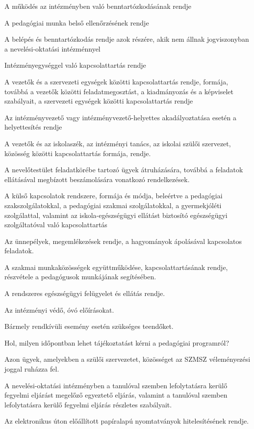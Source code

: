 A működés az intézményben való benntartózkodásának rendje

A pedagógiai munka belső ellenőrzésének rendje

A belépés és benntartózkodás rendje azok részére, akik nem állnak jogviszonyban a nevelési-oktatási intézménnyel

Intézményegységgel való kapcsolattartás rendje


A vezetők és a szervezeti egységek közötti kapcsolattartás rendje, formája, továbbá a vezetők közötti feladatmegosztást, a kiadmányozás és a képviselet szabályait, a szervezeti egységek közötti kapcsolattartás rendje

Az intézményvezető vagy intézményvezető-helyettes akadályoztatása esetén a helyettesítés rendje

A vezetők és az iskolaszék, az intézményi tanács, az iskolai szülői szervezet, közösség közötti kapcsolattartás formája, rendje.

A nevelőtestület feladatkörébe tartozó ügyek átruházására, továbbá a feladatok ellátásával megbízott beszámolására vonatkozó rendelkezések.

A külső kapcsolatok rendszere, formája és módja, beleértve a pedagógiai szakszolgálatokkal, a pedagógiai szakmai szolgálatokkal, a gyermekjóléti szolgálattal, valamint az iskola-egészségügyi ellátást biztosító egészségügyi szolgáltatóval való kapcsolattartás

Az ünnepélyek, megemlékezések rendje, a hagyományok ápolásával kapcsolatos feladatok.

A szakmai munkaközösségek együttműködése, kapcsolattartásának rendje, részvétele a pedagógusok munkájának segítésében.

A rendszeres egészségügyi felügyelet és ellátás rendje.

Az intézményi védő, óvó előírásokat.

Bármely rendkívüli esemény esetén szükséges teendőket.

Hol, milyen időpontban lehet tájékoztatást kérni a pedagógiai programról?

Azon ügyek, amelyekben a szülői szervezetet, közösséget az SZMSZ véleményezési joggal ruházza fel.

A nevelési-oktatási intézményben a tanulóval szemben lefolytatásra kerülő fegyelmi eljárást megelőző egyeztető eljárás, valamint a tanulóval szemben lefolytatásra kerülő fegyelmi eljárás részletes szabályait.

Az elektronikus úton előállított papíralapú nyomtatványok hitelesítésének rendje.

